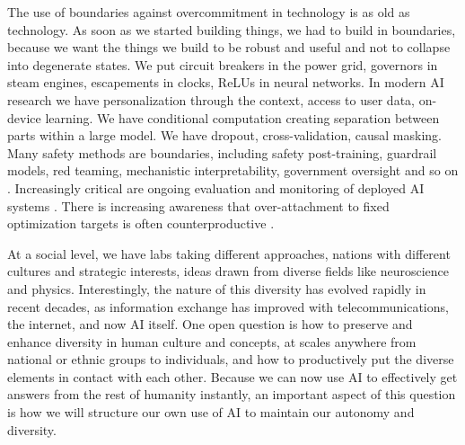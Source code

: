 \documentclass[12pt]{article}
\begin{document}
The use of boundaries against overcommitment in technology is as old as technology. As soon as we started building things, we had to build in boundaries, because we want the things we build to be robust and useful and not to collapse into degenerate states. We put circuit breakers in the power grid, governors in steam engines, escapements in clocks, ReLUs in neural networks. In modern AI research we have personalization through the context, access to user data, on-device learning. We have conditional computation creating separation between parts within a large model. We have dropout, cross-validation, causal masking. Many safety methods are boundaries, including safety post-training, guardrail models, red teaming, mechanistic interpretability, government oversight and so on \citep{gabriel2025ethics}. Increasingly critical are ongoing evaluation and monitoring of deployed AI systems \citep{grey2025safety, myllyaho2021systematic, yampolskiy2025monitorability}. There is increasing awareness that over-attachment to fixed optimization targets is often counterproductive \citep{kumar2025questioning,stanley2017open, stanley2015greatness}. 




At a social level, we have labs taking different approaches, nations with different cultures and strategic interests, ideas drawn from diverse fields like neuroscience and physics. Interestingly, the nature of this diversity has evolved rapidly in recent decades, as information exchange has improved with telecommunications, the internet, and now AI itself. One open question is how to preserve and enhance diversity in human culture and concepts, at scales anywhere from national or ethnic groups to individuals, and how to productively put the diverse elements in contact with each other. Because we can now use AI to effectively get answers from the rest of humanity instantly, an important aspect of this question is how we will structure our own use of AI to maintain our autonomy and diversity. 
\end{document}
